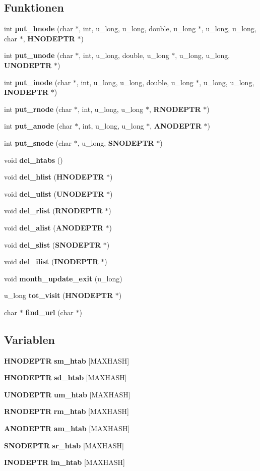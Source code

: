 \subsection*{Funktionen}
\begin{CompactItemize}
\item 
int {\bf put\_\-hnode} (char $\ast$, int, u\_\-long, u\_\-long, double, u\_\-long $\ast$, u\_\-long, u\_\-long, char $\ast$, {\bf HNODEPTR} $\ast$)
\item 
int {\bf put\_\-unode} (char $\ast$, int, u\_\-long, double, u\_\-long $\ast$, u\_\-long, u\_\-long, {\bf UNODEPTR} $\ast$)
\item 
int {\bf put\_\-inode} (char $\ast$, int, u\_\-long, u\_\-long, double, u\_\-long $\ast$, u\_\-long, u\_\-long, {\bf INODEPTR} $\ast$)
\item 
int {\bf put\_\-rnode} (char $\ast$, int, u\_\-long, u\_\-long $\ast$, {\bf RNODEPTR} $\ast$)
\item 
int {\bf put\_\-anode} (char $\ast$, int, u\_\-long, u\_\-long $\ast$, {\bf ANODEPTR} $\ast$)
\item 
int {\bf put\_\-snode} (char $\ast$, u\_\-long, {\bf SNODEPTR} $\ast$)
\item 
void {\bf del\_\-htabs} ()
\item 
void {\bf del\_\-hlist} ({\bf HNODEPTR} $\ast$)
\item 
void {\bf del\_\-ulist} ({\bf UNODEPTR} $\ast$)
\item 
void {\bf del\_\-rlist} ({\bf RNODEPTR} $\ast$)
\item 
void {\bf del\_\-alist} ({\bf ANODEPTR} $\ast$)
\item 
void {\bf del\_\-slist} ({\bf SNODEPTR} $\ast$)
\item 
void {\bf del\_\-ilist} ({\bf INODEPTR} $\ast$)
\item 
void {\bf month\_\-update\_\-exit} (u\_\-long)
\item 
u\_\-long {\bf tot\_\-visit} ({\bf HNODEPTR} $\ast$)
\item 
char $\ast$ {\bf find\_\-url} (char $\ast$)
\end{CompactItemize}
\subsection*{Variablen}
\begin{CompactItemize}
\item 
{\bf HNODEPTR} {\bf sm\_\-htab} [MAXHASH]
\item 
{\bf HNODEPTR} {\bf sd\_\-htab} [MAXHASH]
\item 
{\bf UNODEPTR} {\bf um\_\-htab} [MAXHASH]
\item 
{\bf RNODEPTR} {\bf rm\_\-htab} [MAXHASH]
\item 
{\bf ANODEPTR} {\bf am\_\-htab} [MAXHASH]
\item 
{\bf SNODEPTR} {\bf sr\_\-htab} [MAXHASH]
\item 
{\bf INODEPTR} {\bf im\_\-htab} [MAXHASH]
\end{CompactItemize}


